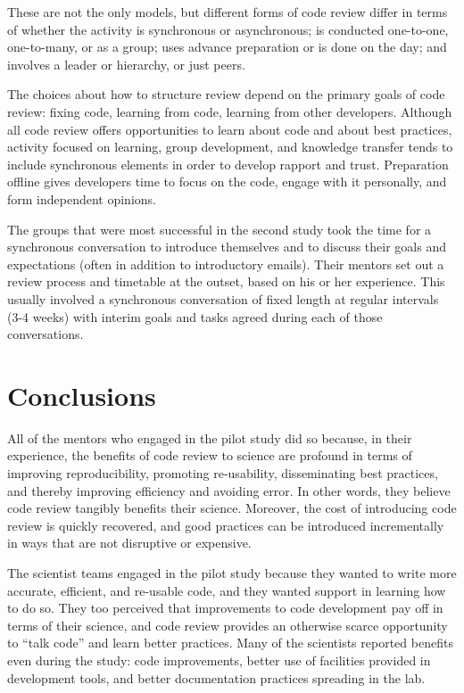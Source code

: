 \documentclass[10pt,twocolumn]{article}
\begin{document}
These are not the only models,
but different forms of code review differ in terms of whether the activity
is synchronous or asynchronous;
is conducted one-to-one, one-to-many, or as a group;
uses advance preparation or is done on the day; and
involves a leader or hierarchy, or just peers.

The choices about how to structure review depend on the primary goals of code review:
fixing code, learning from code, learning from other developers.
Although all code review offers opportunities to learn about code and about best practices,
activity focused on learning, group development, and knowledge transfer tends to include synchronous elements
in order to develop rapport and trust.
Preparation offline gives developers time to focus on the code,
engage with it personally,
and form independent opinions. 

The groups that were most successful in the second study
took the time for a synchronous conversation to introduce themselves and to discuss their goals and expectations
(often in addition to introductory emails).
Their mentors set out a review process and timetable at the outset,
based on his or her experience.
This usually involved a synchronous conversation of fixed length at regular intervals (3-4 weeks)
with interim goals and tasks agreed during each of those conversations.

\section{Conclusions}

All of the mentors who engaged in the pilot study did so because,
in their experience,
the benefits of code review to science are profound in terms of improving reproducibility,
promoting re-usability,
disseminating best practices,
and thereby improving efficiency and avoiding error.
In other words,
they believe code review tangibly benefits their science.
Moreover,
the cost of introducing code review is quickly recovered,
and good practices can be introduced incrementally in ways that are not disruptive or expensive.  

The scientist teams engaged in the pilot study because they wanted to write more accurate, efficient, and re-usable code,
and they wanted support in learning how to do so.
They too perceived that improvements to code development pay off in terms of their science,
and code review provides an otherwise scarce opportunity to ``talk code'' and learn better practices.
Many of the scientists reported benefits even during the study:
code improvements,
better use of facilities provided in development tools,
and better documentation practices spreading in the lab.  
\end{document}
